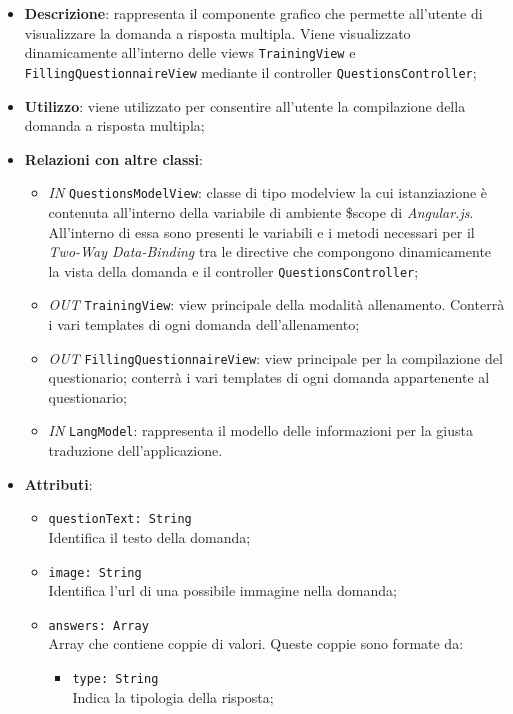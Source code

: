 		\begin{itemize}
			\item \textbf{Descrizione}: rappresenta il componente grafico che permette all'utente di visualizzare la domanda a risposta multipla. Viene visualizzato dinamicamente all'interno delle views \texttt{TrainingView} e \texttt{FillingQuestionnaireView} mediante il controller \texttt{QuestionsController};
			\item \textbf{Utilizzo}: viene utilizzato per consentire all'utente la compilazione della domanda a risposta multipla;
			\item \textbf{Relazioni con altre classi}: 
			\begin{itemize}
				\item \textit{IN} \texttt{QuestionsModelView}: classe di tipo modelview la cui istanziazione è contenuta all'interno della variabile di ambiente \$scope di \textit{Angular.js}. All'interno di essa sono presenti le variabili e i metodi necessari per il \textit{Two-Way Data-Binding} tra le directive che compongono dinamicamente la vista della domanda e il controller \texttt{QuestionsController};
				\item \textit{OUT} \texttt{TrainingView}: view principale della modalità allenamento. Conterrà i vari templates di ogni domanda dell'allenamento;
				\item \textit{OUT} \texttt{FillingQuestionnaireView}: view principale per la compilazione del questionario; conterrà i vari templates di ogni domanda appartenente al questionario;   
				\item \textit{IN} \texttt{LangModel}: rappresenta il modello delle informazioni per la giusta traduzione dell'applicazione.
			\end{itemize}
			\item \textbf{Attributi}: 
			\begin{itemize}
				\item \texttt{questionText: String} \\ Identifica il testo della domanda;
				\item \texttt{image: String} \\ Identifica l'url di una possibile immagine nella domanda;
				\item \texttt{answers: Array}\\ Array che contiene coppie di valori. Queste coppie sono formate da:
				\begin{itemize}
					\item \texttt{type: String} \\ Indica la tipologia della risposta;

\end{itemize}
\end{itemize}
\end{itemize}
